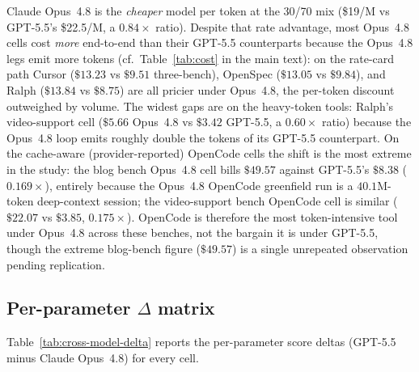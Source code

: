 Claude Opus~4.8 is the \emph{cheaper} model per token at the 30/70
mix (\$19/M vs GPT-5.5's \$22.5/M, a $0.84\times$ ratio).
Despite that rate advantage, most Opus~4.8 cells cost \emph{more}
end-to-end than their GPT-5.5 counterparts because the Opus~4.8 legs
emit more tokens (cf.\ Table~\ref{tab:cost} in the main text): on the
rate-card path Cursor ($\$13.23$ vs $\$9.51$ three-bench), OpenSpec
($\$13.05$ vs $\$9.84$), and Ralph ($\$13.84$ vs $\$8.75$) are all
pricier under Opus~4.8, the per-token discount outweighed by volume.
The widest gaps are on the heavy-token tools: Ralph's video-support cell
($\$5.66$ Opus~4.8 vs $\$3.42$ GPT-5.5, a $0.60\times$ ratio) because
the Opus~4.8 loop emits roughly double the tokens of its GPT-5.5
counterpart. On the cache-aware (provider-reported) OpenCode cells the
shift is the most extreme in the study: the blog bench Opus~4.8
cell bills $\$49.57$ against GPT-5.5's $\$8.38$ ($0.169\times$),
entirely because the Opus~4.8 OpenCode greenfield run is a $40.1$M-token
deep-context session; the video-support bench OpenCode cell is similar
($\$22.07$ vs $\$3.85$, $0.175\times$). OpenCode is therefore the
most token-intensive tool under Opus~4.8 across these benches, not the
bargain it is under GPT-5.5, though the extreme blog-bench figure
($\$49.57$) is a single unrepeated observation pending replication.

\subsection{Per-parameter $\Delta$ matrix}

Table~\ref{tab:cross-model-delta} reports the per-parameter score
deltas (GPT-5.5 minus Claude Opus~4.8) for every cell.

